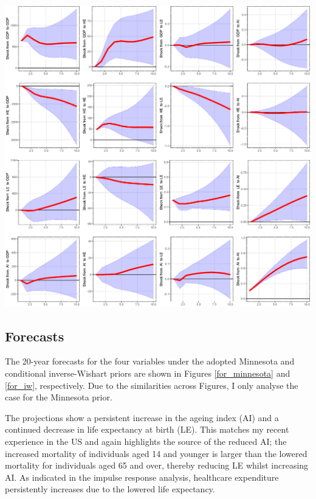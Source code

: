 \documentclass[11pt,preprint, authoryear]{elsarticle}
\let\origfigure\figure
\let\endorigfigure\endfigure
\renewenvironment{figure}[1][2] {
    \expandafter\origfigure\expandafter[H]
} {
    \endorigfigure
}
\numberwithin{equation}{section}
\numberwithin{figure}{section}
\numberwithin{table}{section}
\begin{document}
\begin{figure}
  \centering
  \includegraphics[width=\textwidth]{irf_iw.eps}
  \caption{Conditional normal inverse-Wishart prior: Impulse responses. Each plot shows the percentage-point response of the indicated variable from its steady state to a one-standard-deviation indicated shock when the Conditional normal inverse-Wishart  prior was adopted. Periods are in years. In the case of responses from GDP (growth) and HE, the responses are given as the percentage point times 100. }
  \label{irf_iw}
\end{figure}

\hypertarget{forecasts}{%
\subsection{Forecasts}\label{forecasts}}

The 20-year forecasts for the four variables under the adopted Minnesota
and conditional inverse-Wishart priors are shown in Figures
\ref{for_minnesota} and \ref{for_iw}, respectively. Due to the
similarities across Figures, I only analyse the case for the Minnesota
prior.

The projections show a persistent increase in the ageing index (AI) and
a continued decrease in life expectancy at birth (LE). This matches my
recent experience in the US and again highlights the source of the
reduced AI; the increased mortality of individuals aged 14 and younger
is larger than the lowered mortality for individuals aged 65 and over,
thereby reducing LE whilst increasing AI. As indicated in the impulse
response analysis, healthcare expenditure persistently increases due to
the lowered life expectancy.
\end{document}
